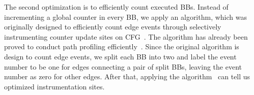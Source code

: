 The second optimization is to efficiently count executed BBs.
Instead of incrementing a global counter in every BB,
we apply an algorithm, which was originally designed to efficiently 
count edge events through selectively instrumenting counter update sites 
on CFG~\cite{event-counting}.
The algorithm has already been proved to conduct path 
profiling efficiently~\cite{path-profiling,peter-ase}.  
Since the original algorithm is design to count edge events, 
we split each BB into two and label the event number to be one for 
edges connecting a pair of split BBs, 
leaving the event number as zero for other edges. 
After that, applying the algorithm~\cite{event-counting}
can tell us optimized instrumentation sites. 


